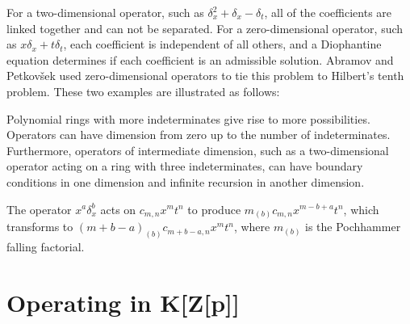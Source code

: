 \documentclass{article}
\begin{document}
\begin{center}
\end{center}


For a two-dimensional operator, such as $\delta_x^2+\delta_x-\delta_t$,
all of the coefficients are linked together and can not be separated.
For a zero-dimensional operator, such as $x\delta_x + t\delta_t$,
each coefficient is independent of all others, and a Diophantine
equation determines if each coefficient is an admissible solution.
Abramov and Petkov\v sek used zero-dimensional operators to tie
this problem to Hilbert's tenth problem.
These two examples are illustrated as follows:

\begin{center}
\end{center}

Polynomial rings with more indeterminates give rise to more possibilities.
Operators can have dimension from zero up to the number of indeterminates.
Furthermore, operators of intermediate dimension, such as a two-dimensional
operator acting on a ring with three indeterminates, can have boundary
conditions in one dimension and infinite recursion in another dimension.

The operator $x^a \delta_x^b$ acts on $c_{m,n} x^m t^n$ to
produce $m_{(b)} c_{m,n} x^{m-b+a} t^n$, which transforms
to $(m+b-a)_{(b)} c_{m+b-a,n} x^m t^n$, where $m_{(b)}$ is
the Pochhammer falling factorial.

\vfill\eject
\section*{Operating in K[Z[p]]}
\end{document}
